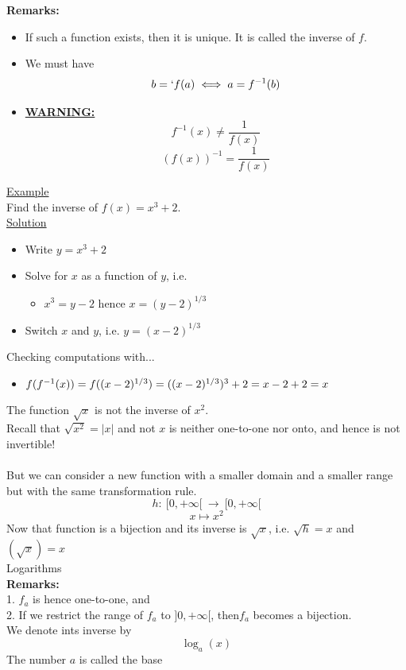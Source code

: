 \documentclass[]{article}
\begin{document}
	{\bf Remarks:}\\
	\begin{itemize}
		\item If such  a function exists, then it is unique. It is called the inverse of $f$.
		\item We must have
		$$b=`f(a) \iff a=f^{-1}(b)$$
		\item\underline{\bf WARNING:}
		$$f^{-1}(x)\ne\frac{1}{f(x)}$$
		$$(f(x))^{-1}=\frac{1}{f(x)}$$
	\end{itemize}
	\underline{Example}\\
	Find the inverse of $f(x)=x^3+2$.\\
	\underline{Solution}
	\begin{itemize}
		\item Write $y=x^3+2$
		\item Solve for $x$ as a function of $y$, i.e.
		\begin{itemize}
			\item $x^3=y-2$ hence $x=(y-2)^{1/3}$
		\end{itemize}
		\item Switch $x$ and $y$, i.e. $y=(x-2)^{1/3}$
	\end{itemize}
	Checking computations with...
	\begin{itemize}
		\item$f(f^{-1}(x))=f((x-2)^{1/3})\\
		=((x-2)^{1/3})^3+2\\
		=x-2+2=x$
	\end{itemize}
	The function $\sqrt{x}$ is not the inverse of $x^2$.\\
	Recall that $\sqrt{x^2}=|x|$ and not $x$ is neither one-to-one nor onto, and hence is not invertible!\\\\
	But we can consider a new function with a smaller domain and a smaller range but with the same transformation rule.
	$$h:~[0,+\infty[~\longrightarrow~[0,+\infty[$$
	$$x\mapsto x^2$$
	Now that function is a bijection and its inverse is $\sqrt{x}$, i.e. $\sqrt{h}=x$ and $(\sqrt{x})=x$
	\pagebreak\\
	\Large{Logarithms}\\
	\normalsize{\bf Remarks:}\\
	1. $f_a$ is hence one-to-one, and\\
	2. If we restrict the range of $f_a$ to $]0,+\infty[$, then$f_a$ becomes a bijection.\\
	We denote ints inverse by
	$$\log_a(x)$$
	The number $a$ is called the base\\
\end{document}
